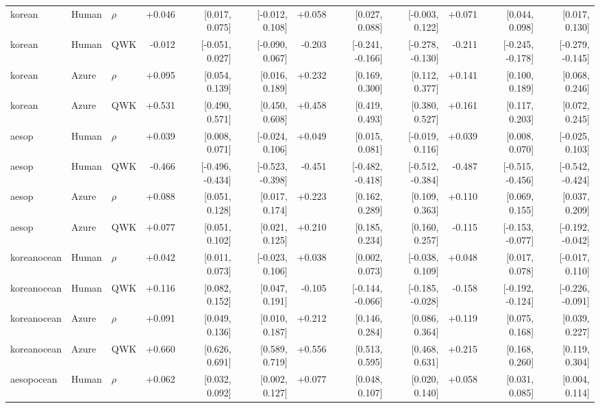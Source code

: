 \documentclass[10pt]{article}
\begin{document}
\begin{landscape}
\begin{longtable}{@{}lllrrrrrrrrr@{}}
\addlinespace[2pt]
korean & Human & $\rho$ & +0.046 & [0.017, 0.075] & [-0.012, 0.108] & +0.058 & [0.027, 0.088] & [-0.003, 0.122] & +0.071 & [0.044, 0.098] & [0.017, 0.130]\\
korean & Human & QWK & -0.012 & [-0.051, 0.027] & [-0.090, 0.067] & -0.203 & [-0.241, -0.166] & [-0.278, -0.130] & -0.211 & [-0.245, -0.178] & [-0.279, -0.145]\\
korean & Azure & $\rho$ & +0.095 & [0.054, 0.139] & [0.016, 0.189] & +0.232 & [0.169, 0.300] & [0.112, 0.377] & +0.141 & [0.100, 0.189] & [0.068, 0.246]\\
korean & Azure & QWK & +0.531 & [0.490, 0.571] & [0.450, 0.608] & +0.458 & [0.419, 0.493] & [0.380, 0.527] & +0.161 & [0.117, 0.203] & [0.072, 0.245]\\
\addlinespace[2pt]
aesop & Human & $\rho$ & +0.039 & [0.008, 0.071] & [-0.024, 0.106] & +0.049 & [0.015, 0.081] & [-0.019, 0.116] & +0.039 & [0.008, 0.070] & [-0.025, 0.103]\\
aesop & Human & QWK & -0.466 & [-0.496, -0.434] & [-0.523, -0.398] & -0.451 & [-0.482, -0.418] & [-0.512, -0.384] & -0.487 & [-0.515, -0.456] & [-0.542, -0.424]\\
aesop & Azure & $\rho$ & +0.088 & [0.051, 0.128] & [0.017, 0.174] & +0.223 & [0.162, 0.289] & [0.109, 0.363] & +0.110 & [0.069, 0.155] & [0.037, 0.209]\\
aesop & Azure & QWK & +0.077 & [0.051, 0.102] & [0.021, 0.125] & +0.210 & [0.185, 0.234] & [0.160, 0.257] & -0.115 & [-0.153, -0.077] & [-0.192, -0.042]\\
\addlinespace[2pt]
koreanocean & Human & $\rho$ & +0.042 & [0.011, 0.073] & [-0.023, 0.106] & +0.038 & [0.002, 0.073] & [-0.038, 0.109] & +0.048 & [0.017, 0.078] & [-0.017, 0.110]\\
koreanocean & Human & QWK & +0.116 & [0.082, 0.152] & [0.047, 0.191] & -0.105 & [-0.144, -0.066] & [-0.185, -0.028] & -0.158 & [-0.192, -0.124] & [-0.226, -0.091]\\
koreanocean & Azure & $\rho$ & +0.091 & [0.049, 0.136] & [0.010, 0.187] & +0.212 & [0.146, 0.284] & [0.086, 0.364] & +0.119 & [0.075, 0.168] & [0.039, 0.227]\\
koreanocean & Azure & QWK & +0.660 & [0.626, 0.691] & [0.589, 0.719] & +0.556 & [0.513, 0.595] & [0.468, 0.631] & +0.215 & [0.168, 0.260] & [0.119, 0.304]\\
\addlinespace[2pt]
aesopocean & Human & $\rho$ & +0.062 & [0.032, 0.092] & [0.002, 0.127] & +0.077 & [0.048, 0.107] & [0.020, 0.140] & +0.058 & [0.031, 0.085] & [0.004, 0.114]\\

\end{longtable}
\end{landscape}
\end{document}
